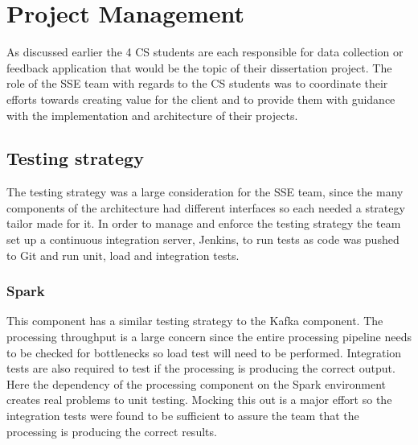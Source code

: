 \documentclass[prodmode,acmtosem]{acmsmall} %
\begin{document}


\section{Project Management}
As discussed earlier the 4 CS students are each responsible for data collection or feedback application that would be the topic of their dissertation project.
The role of the SSE team with regards to the CS students was to coordinate their efforts towards creating value for the client and to provide them with guidance with the implementation and architecture of their projects.

\subsection{Testing strategy}
The testing strategy was a large consideration for the SSE team, since the many components of the architecture had different interfaces so each needed a strategy tailor made for it. In order to manage and enforce the testing strategy the team set up a continuous integration server, Jenkins, to run tests as code was pushed to Git and run unit, load and integration tests.

\subsubsection{Spark}
This component has a similar testing strategy to the Kafka component. The processing throughput is a large concern since the entire processing pipeline needs to be checked for bottlenecks so load test will need to be performed. Integration tests are also required to test if the processing is producing the correct output. Here the dependency of the processing component on the Spark environment creates real problems to unit testing. Mocking this out is a major effort so the integration tests were found to be sufficient to assure the team that the processing is producing the correct results.
\end{document}

